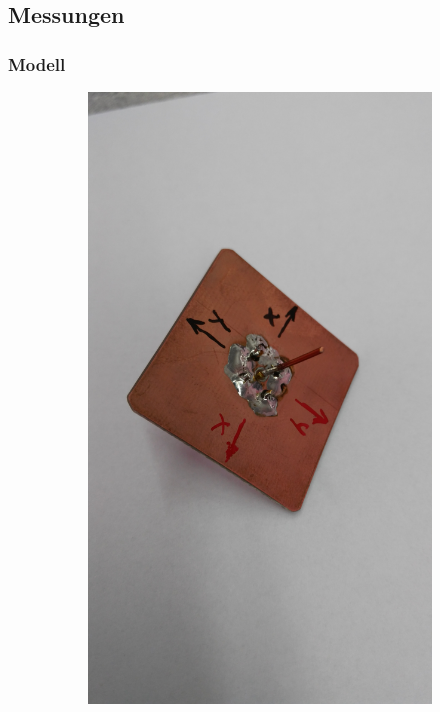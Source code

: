 \newpage
\subsection{Messungen}

\subsubsection{Modell}


\begin{figure}[h!]
	\centering
	\begin{subfigure}[b]{0.22\textwidth}
		\includegraphics[width=1\textwidth]{../fig/pic/monopol_model_1.jpg}

\end{subfigure}
\end{figure}
